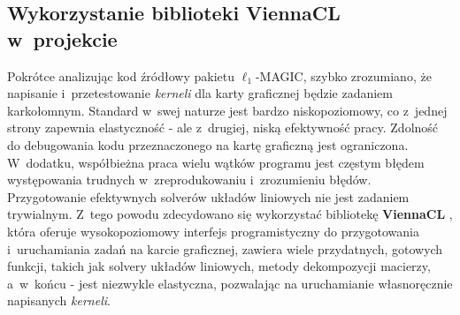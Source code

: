 \subsection{Wykorzystanie biblioteki ViennaCL w~projekcie}
Pokrótce analizując kod źródłowy pakietu $\ell_1$-MAGIC, szybko zrozumiano, że napisanie i~przetestowanie \textit{kerneli} dla karty graficznej będzie zadaniem karkołomnym. Standard w~swej naturze jest bardzo niskopoziomowy, co z~jednej strony zapewnia elastyczność - ale z~drugiej, niską efektywność pracy. Zdolność do debugowania kodu przeznaczonego na kartę graficzną jest ograniczona. W~dodatku, współbieżna praca wielu wątków programu jest częstym błędem występowania trudnych w~zreprodukowaniu i~zrozumieniu błędów. Przygotowanie efektywnych solverów układów liniowych nie jest zadaniem trywialnym. Z~tego powodu zdecydowano się wykorzystać bibliotekę \textbf{ViennaCL} \cite{ViennaCL}, która oferuje wysokopoziomowy interfejs programistyczny do przygotowania i~uruchamiania zadań na karcie graficznej, zawiera wiele przydatnych, gotowych funkcji, takich jak solvery układów liniowych, metody dekompozycji macierzy, a~w~końcu - jest niezwykle elastyczna, pozwalając na uruchamianie własnoręcznie napisanych \textit{kerneli}.

